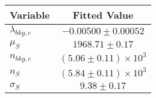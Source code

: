 \begin{tabular}[t]{lc}
\hline
Variable &Fitted Value\\
\hline\hline
$\lambda_{bkg,c}$&$-0.00500\pm0.00052$\\
\hline
$\mu_{S}$&$1968.71\pm0.17$\\
\hline
$n_{bkg,c}$&$(5.06\pm0.11)\times 10^3$\\
\hline
$n_{S}$&$(5.84\pm0.11)\times 10^3$\\
\hline
$\sigma_{S}$&$9.38\pm0.17$\\
\hline
\end{tabular}